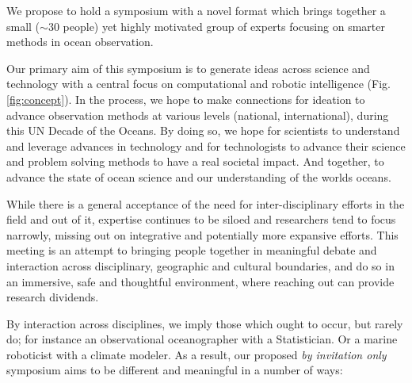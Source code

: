 \documentclass[10pt,letterpaper]{article}
\begin{document}
\vspace{+0.25in}

\noindent
We propose to hold a symposium with a novel format which brings
together a small ($\sim 30$ people) yet highly motivated group of
experts focusing on smarter methods in ocean observation.%

Our primary aim of this symposium is to generate ideas across science
and technology with a central focus on computational and robotic
intelligence (Fig. \ref{fig:concept}).  In the process, we hope to
make connections for ideation to advance observation methods at
various levels (national, international), during this \textsf{UN
  Decade of the Oceans}. By doing so, we hope for scientists to
understand and leverage advances in technology and for technologists
to advance their science and problem solving methods to have a real
societal impact. And together, to advance the state of ocean science
and our understanding of the worlds oceans.

While there is a general acceptance of the need for inter-disciplinary
efforts in the field and out of it, expertise continues to be siloed
and researchers tend to focus narrowly, missing out on integrative and
potentially more expansive efforts. This meeting is an attempt to
bringing people together in meaningful debate and interaction across
disciplinary, geographic and cultural boundaries, and do so in an
immersive, safe and thoughtful environment, where reaching out can
provide research dividends.

By interaction across disciplines, we imply those which ought to
occur, but rarely do; for instance an observational oceanographer with
a Statistician. Or a marine roboticist with a climate modeler. As a
result, our proposed \emph{by invitation only} symposium aims to be
different and meaningful in a number of ways:
\end{document}
